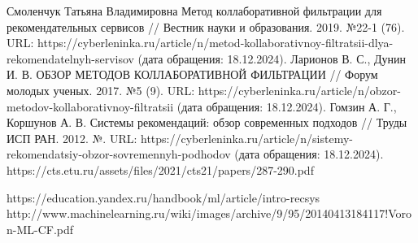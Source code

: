 \documentclass[bachelor, och, referat]{shiza}
\begin{document}
\begin{thebibliography}{3}
  Смоленчук Татьяна Владимировна Метод коллаборативной фильтрации для рекомендательных сервисов // Вестник науки и образования. 2019. №22-1 (76). URL: https://cyberleninka.ru/article/n/metod-kollaborativnoy-filtratsii-dlya-rekomendatelnyh-servisov (дата обращения: 18.12.2024).
  Ларионов В. С., Дунин И. В. ОБЗОР МЕТОДОВ КОЛЛАБОРАТИВНОЙ ФИЛЬТРАЦИИ // Форум молодых ученых. 2017. №5 (9). URL: https://cyberleninka.ru/article/n/obzor-metodov-kollaborativnoy-filtratsii (дата обращения: 18.12.2024). 
  Гомзин А. Г., Коршунов А. В. Системы рекомендаций: обзор современных подходов // Труды ИСП РАН. 2012. №. URL: https://cyberleninka.ru/article/n/sistemy-rekomendatsiy-obzor-sovremennyh-podhodov (дата обращения: 18.12.2024).
 https://cts.etu.ru/assets/files/2021/cts21/papers/287-290.pdf

 https://education.yandex.ru/handbook/ml/article/intro-recsys
 http://www.machinelearning.ru/wiki/images/archive/9/95/20140413184117!Voron-ML-CF.pdf
\end{thebibliography}
\end{document}
